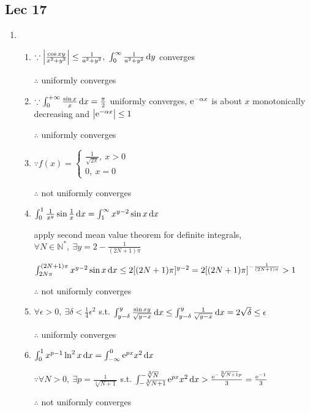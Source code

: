 \subsection{Lec 17}

\begin{enumerate}[1]
    \item 
    \begin{enumerate}[(1)]
        \item 
        $\because \left|\frac{\cos{xy}}{x^2+y^2}\right| \leq \frac{1}{a^2+y^2},\ \int_0^{\infty}\frac{1}{a^2+y^2}\dif y$ converges
        \par $\therefore $ uniformly converges
        
        \item 
        $\because \int_0^{+\infty}\frac{\sin{x}}{x}\dif x = \frac{\pi}{2}$ uniformly converges, $ \mathrm{e}^{-\alpha x} $ is about $x$ monotonically decreasing and $\left|\mathrm{e}^{-\alpha x}\right|\leq 1$
        \par $\therefore $ uniformly converges
        
        \item 
        $\because f(x)=\begin{cases}\frac{1}{\sqrt{2\pi}},\ x>0 \\0,\ x=0 \end{cases}$
        \par $\therefore $ not uniformly converges

        
        \item 
        $\int_0^1\frac{1}{x^y}\sin{\frac{1}{x}}\dif x=\int_1^\infty x^{y-2}\sin{x}\dif x$
        \par apply second mean value theorem for definite integrals, $\forall N \in \mathbb{N}^*,\ \exists y=2-\frac{1}{(2N+1)\pi}$
        \par $\int_{2N\pi}^{(2N+1)\pi}x^{y-2}\sin{x}\dif x\leq 2[(2N+1)\pi]^{y-2} = 2[(2N+1)\pi]^{-\frac{1}{(2N+1)\pi}}>1$
        \par $\therefore $ not uniformly converges
        
        \item 
        $ \forall \epsilon > 0,\ \exists \delta < \frac{1}{4} \epsilon^2 $ s.t. $ \int_{y-\delta}^y \frac{\sin xy}{\sqrt{y-x}} \dif x \leq  \int_{y-\delta}^y \frac{1}{\sqrt{y-x}} \dif x =2\sqrt{\delta } \leq \epsilon $
        \par $\therefore $ uniformly converges

        
        \item 
        $\int_0^1x^{p-1}\ln^2{x}\dif x=\int_{-\infty}^0\me^{px}x^2\dif x$
        \par $\because \forall N >0,\ \exists p=\frac{1}{\sqrt[3]{N+1}}$ s.t. $\int_{-\sqrt[3]{N+1}}^{-\sqrt[3]{N}}\me^{px}x^2\dif x>\frac{\me^{-\sqrt[3]{N+1}p}}{3} = \frac{\me^{-1}}{3}$
        \par $\therefore $ not uniformly converges


\end{enumerate}
\end{enumerate}
